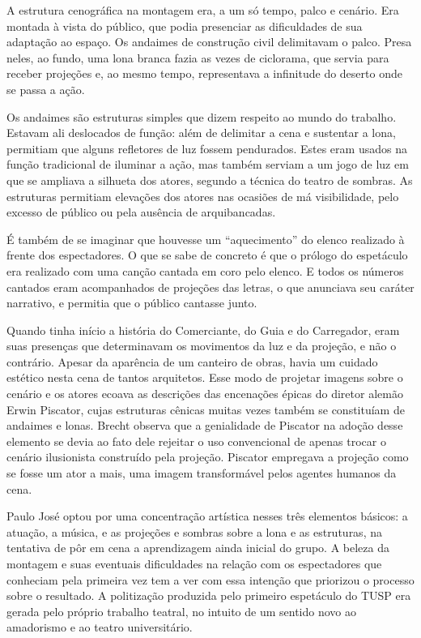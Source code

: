 A estrutura cenográfica na montagem era, a um só tempo, palco e cenário.
Era montada à vista do público, que podia presenciar as dificuldades de
sua adaptação ao espaço. Os andaimes de construção civil delimitavam o
palco. Presa neles, ao fundo, uma lona branca fazia as vezes de
ciclorama, que servia para receber projeções e, ao mesmo tempo,
representava a infinitude do deserto onde se passa a ação.

Os andaimes são estruturas simples que dizem respeito ao mundo do
trabalho. Estavam ali deslocados de função: além de delimitar a cena e
sustentar a lona, permitiam que alguns refletores de luz fossem
pendurados. Estes eram usados na função tradicional de iluminar a ação,
mas também serviam a um jogo de luz em que se ampliava a silhueta dos
atores, segundo a técnica do teatro de sombras. As estruturas permitiam
elevações dos atores nas ocasiões de má visibilidade, pelo excesso de
público ou pela ausência de arquibancadas.

É também de se imaginar que houvesse um “aquecimento” do elenco
realizado à frente dos espectadores. O que se sabe de concreto é que o
prólogo do espetáculo era realizado com uma canção cantada em coro pelo
elenco. E todos os números cantados eram acompanhados de projeções das
letras, o que anunciava seu caráter narrativo, e permitia que o público
cantasse junto.

Quando tinha início a história do Comerciante, do Guia e do Carregador,
eram suas presenças que determinavam os movimentos da luz e da projeção,
e não o contrário. Apesar da aparência de um canteiro de obras, havia um
cuidado estético nesta cena de tantos arquitetos. Esse modo de projetar
imagens sobre o cenário e os atores ecoava as descrições das encenações
épicas do diretor alemão Erwin Piscator, cujas estruturas cênicas muitas
vezes também se constituíam de andaimes e lonas. Brecht observa que a
genialidade de Piscator na adoção desse elemento se devia ao fato dele
rejeitar o uso convencional de apenas trocar o cenário ilusionista
construído pela projeção. Piscator empregava a projeção como se fosse um
ator a mais, uma imagem transformável pelos agentes humanos da cena.

Paulo José optou por uma concentração artística nesses três elementos
básicos: a atuação, a música, e as projeções e sombras sobre a lona e as
estruturas, na tentativa de pôr em cena a aprendizagem ainda inicial do
grupo. A beleza da montagem e suas eventuais dificuldades na relação com
os espectadores que conheciam pela primeira vez tem a ver com essa
intenção que priorizou o processo sobre o resultado. A politização
produzida pelo primeiro espetáculo do TUSP era gerada pelo próprio
trabalho teatral, no intuito de um sentido novo ao amadorismo e ao
teatro universitário.

